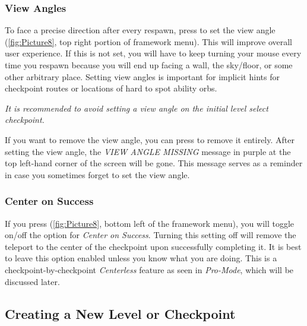 \documentclass[12pt,a4paper]{article}
\begin{document}
        \subsubsection{View Angles}
        
            To face a precise direction after every respawn, press  
            to set the view angle (\cref{fig:Picture8}, top right portion of framework menu). This will improve overall user experience.
            If this is not set, you will have to keep turning your mouse every
            time you respawn because you will end up facing a wall, the sky/floor, or some other arbitrary place. 
            Setting view angles is important for implicit hints for checkpoint routes or locations of hard to spot ability orbs.
            
            \emph{It is recommended to avoid setting a view angle on the initial level select checkpoint.}
            
            If you want to remove the view angle, you can press  to remove it entirely. 
            After setting the view angle, the \emph{VIEW ANGLE MISSING} message in purple at the top left-hand corner of the screen will be gone. 
            This message serves as a reminder in case you sometimes forget to set the view angle. 
    
        \subsubsection{Center on Success}
            
            If you press  (\cref{fig:Picture8}, bottom left of the framework menu), you will 
            toggle on/off the option for \emph{Center on Success}. Turning this setting off will remove the teleport to the center of the checkpoint upon successfully completing it. It is best to leave this option enabled unless you know what you are doing. This is a checkpoint-by-checkpoint \emph{Centerless} feature as seen in \emph{Pro-Mode}, which will be discussed later.
            
    \subsection{Creating a New Level or Checkpoint}
    
\end{document}
